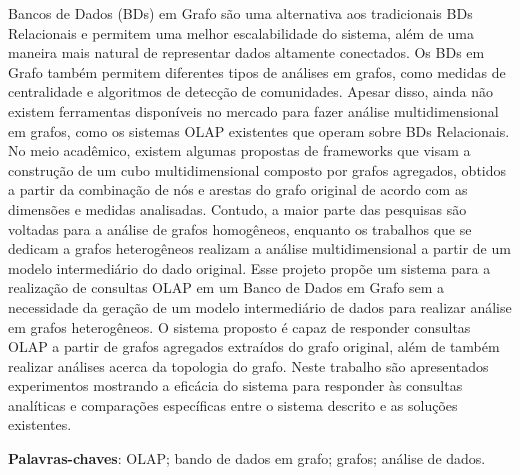 \begin{resumo}[Resumo]
Bancos de Dados (BDs) em Grafo s\~{a}o uma alternativa aos tradicionais BDs Relacionais e permitem uma melhor escalabilidade do sistema, al\'{e}m de uma maneira mais natural de representar dados altamente conectados. Os BDs em Grafo tamb\'{e}m permitem diferentes tipos de an\'{a}lises em grafos, como medidas de centralidade e algoritmos de detec\c{c}\~{a}o de comunidades. Apesar disso, ainda n\~{a}o existem ferramentas dispon\'{i}veis no mercado para fazer an\'{a}lise multidimensional em grafos, como os sistemas OLAP existentes que operam sobre BDs Relacionais. No meio acad\^{e}mico, existem algumas propostas de frameworks que visam a constru\c{c}\~{a}o de um cubo multidimensional composto por grafos agregados, obtidos a partir da combina\c{c}\~{a}o de n\'{o}s e arestas do grafo original de acordo com as dimens\~{o}es e medidas analisadas. Contudo, a maior parte das pesquisas s\~{a}o voltadas para a an\'{a}lise de grafos homog\^{e}neos, enquanto os trabalhos que se dedicam a grafos heterog\^{e}neos realizam a an\'{a}lise multidimensional a partir de um modelo intermedi\'{a}rio do dado original. Esse projeto prop\~{o}e um sistema para a realiza\c{c}\~{a}o de consultas OLAP em um Banco de Dados em Grafo sem a necessidade da gera\c{c}\~{a}o de um modelo intermedi\'{a}rio de dados para realizar an\'{a}lise em grafos heterog\^{e}neos. O sistema proposto \'{e} capaz de responder consultas OLAP a partir de grafos agregados extra\'{i}dos do grafo original, al\'{e}m de tamb\'{e}m realizar an\'{a}lises acerca da topologia do grafo. Neste trabalho s\~{a}o apresentados experimentos mostrando a efic\'{a}cia do sistema para responder \`{a}s consultas anal\'{i}ticas e compara\c{c}\~{o}es espec\'{i}ficas entre o sistema descrito e as solu\c{c}\~{o}es existentes.

 \vspace{\onelineskip}

 \noindent
 \textbf{Palavras-chaves}: OLAP; bando de dados em grafo; grafos; an\'{a}lise de dados.
\end{resumo}
